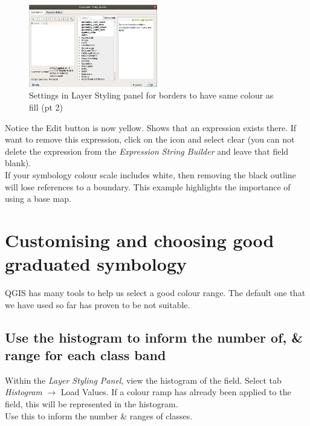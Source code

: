 \begin{figure}[!h]
	\centering
	\includegraphics[width=0.5\textwidth]{images/boarders_area_colour2.png}
	\caption{Settings in Layer Styling panel for borders to have same colour as fill (pt 2)}
	\label{ft_fig_firstfig3}
\end{figure}



Notice the Edit button is now yellow. Shows that an expression exists there. If want to remove this expression, click on the icon and select clear (you can not delete the expression from the \textit{Expression String Builder} and leave that field blank).\\

If your symbology colour scale includes white, then removing the black outline will lose references to a boundary. This example highlights the importance of using a base map.

\section{Customising and choosing good graduated symbology}

QGIS has many tools to help us select a good colour range. The default one that we have used so far has proven to be not suitable.

\subsection{Use the histogram to inform the number of, \& range for each class band}

Within the \textit{Layer Styling Panel}, view the histogram of the field. Select tab \textit{Histogram} $\rightarrow$ Load Values. If a colour ramp has already been applied to the field, this will be represented in the histogram.\\
Use this to inform the number \& ranges of classes.\\


